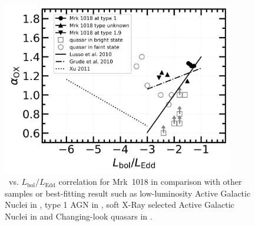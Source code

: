 \begin{figure}
\centering
	\includegraphics[width=0.9\textwidth]{./pic/Mrk1018_subplots_plus_alpha_ox_logLbol_rate.png}
    \caption{\alphaox\, vs. $L_\mathrm{bol}/L_\mathrm{Edd}$ correlation for Mrk~1018 in comparison with other samples or best-fitting result such as low-luminosity Active Galactic Nuclei in \citet[][]{2011ApJ...739...64X}, type 1 AGN in \citet{2010A&A...512A..34L}, soft X-Ray selected Active Galactic Nuclei in \citet[][]{2010ApJS..187...64G} and Changing-look quasars in \citet[][]{2019ApJ...883...76R}. }
    \label{fig:alphaox-bol}
\end{figure}



